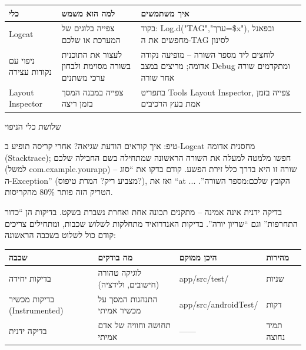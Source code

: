 


\begin{center}
\begin{tabularx}{\linewidth}{|X|X|X|}
\hline
\textbf{כלי} & \textbf{למה הוא משמש} & \textbf{איך משתמשים} \tabularnewline
\hline
Logcat & צפייה בלוגים של המערכת או שלכם & בקוד: Log.d("TAG","ערך=\$x"), ובפאנל מחפשים את ה-TAG לסינון \tabularnewline
ניפוי עם נקודות עצירה & לעצור את התוכנית בשורה מסוימת ולבחון ערכי משתנים & לוחצים ליד מספר השורה – מופיעה נקודה אדומה; מריצים במצב Debug ומתקדמים שורה אחר שורה \tabularnewline
Layout Inspector & צפייה במבנה המסך בזמן ריצה & בתפריט Tools Layout Inspector, צפייה בזמן אמת בעץ הרכיבים \tabularnewline
\hline
\end{tabularx}
\end{center}

\begin{center}\small\color{gray}שלושת כלי הניפוי\end{center}

\begin{tcbinfo}{טיפ: איך קוראים הודעת שגיאה?}
אחרי קריסה תופיע ב-Logcat מחסנית אדומה (Stacktrace); חפשו מלמטה למעלה את השורה הראשונה שמתחילה בשם החבילה שלכם (למשל com.example.yourapp) – שורה זו היא בדרך כלל זירת הפשע. קודם בדקו את “סוג ה-Exception” (מצביע ריק? המרת טיפוס?), ואז את “at ... הקובץ שלכם:מספר השורה”. הטריק הזה פותר 80\% מהקריסות.

\end{tcbinfo}


בדיקה ידנית אינה אמינה – מתקנים תכונה אחת ואחרת נשברת בשקט. בדיקות הן “כדור התחרפות” וגם “שריון יורה”. בדיקות האנדרואיד מתחלקות לשלוש שכבות, ומתחילים צריכים קודם כול לשלוט בשכבה הראשונה:

\begin{center}
\begin{tabularx}{\linewidth}{|X|X|X|X|}
\hline
\textbf{שכבה} & \textbf{מה בודקים} & \textbf{היכן ממוקם} & \textbf{מהירות} \tabularnewline
\hline
בדיקות יחידה & לוגיקה טהורה (חישובים, ולידציה) & app/src/test/ & שניות \tabularnewline
בדיקות מכשיר (Instrumented) & התנהגות המסך על מכשיר אמיתי & app/src/androidTest/ & דקות \tabularnewline
בדיקה ידנית & תחושה וחוויה של אדם אמיתי & —— & תמיד נחוצה \tabularnewline
\hline
\end{tabularx}
\end{center}


